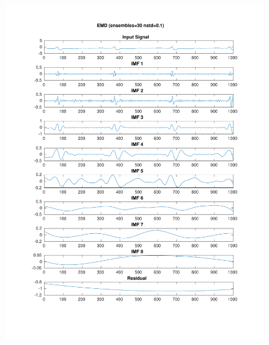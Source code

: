 \documentclass[11pt,a4paper]{article}
\begin{document}
\begin{figure}[H]
\centering
\begin{minipage}{0.48\textwidth}
	\centering
	\includegraphics[width=\textwidth]{fig/118l1_emd_ensemble.pdf}
\end{minipage}
\begin{minipage}{0.48\textwidth}
	\centering

\end{minipage}
\end{figure}
\end{document}
